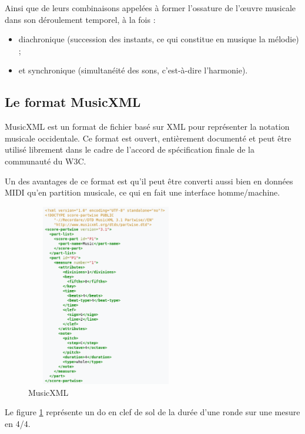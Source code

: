 Ainsi que de leurs combinaisons appelées à former l'ossature de l'œuvre musicale dans son déroulement temporel, à la fois :
\begin{itemize}
	\item diachronique (succession des instants, ce qui constitue en musique la mélodie) ;
	\item et synchronique (simultanéité des sons, c'est-à-dire l'harmonie).
\end{itemize}

\subsection*{Le format MusicXML}
MusicXML est un format de fichier basé sur XML pour représenter la notation musicale occidentale. Ce format est ouvert, entièrement documenté et peut être utilisé librement dans le cadre de l'accord de spécification finale de la communauté du W3C.

Un des avantages de ce format est qu’il peut être converti aussi bien en données MIDI qu’en partition musicale, ce qui en fait une interface homme/machine.

\begin{figure}[h]
	\centering
	\includegraphics[height=80mm, width=70mm]{z_images/1_contexte/6_musicxml.png}
	\caption{MusicXML}
	\label{MusicXML}
\end{figure}

Le figure \ref{MusicXML} représente un do en clef de sol de la durée d’une ronde sur une mesure en 4/4.


